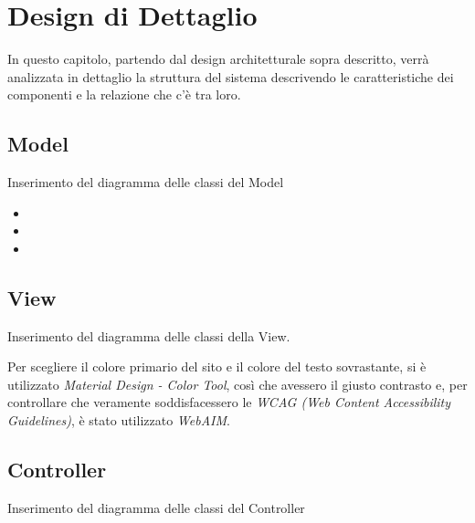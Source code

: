 \chapter{Design di Dettaglio}
In questo capitolo, partendo dal design architetturale sopra descritto, verrà analizzata in dettaglio la struttura del sistema descrivendo le caratteristiche dei componenti e la relazione che c'è tra loro.

    \section{Model}
    Inserimento del diagramma delle classi del Model
        \begin{itemize}
            \item 
            \item 
            \item 
        \end{itemize}
    \section{View}
    Inserimento del diagramma delle classi della View.
    
    Per scegliere il colore primario del sito e il colore del testo sovrastante, si è utilizzato \textit{Material Design - Color Tool}\cite{mdct}, così che avessero il giusto contrasto e, per controllare che veramente soddisfacessero le \textit{WCAG (Web Content Accessibility Guidelines)}\cite{wa}, è stato utilizzato \textit{WebAIM}.
    
    \section{Controller}
    Inserimento del diagramma delle classi del Controller